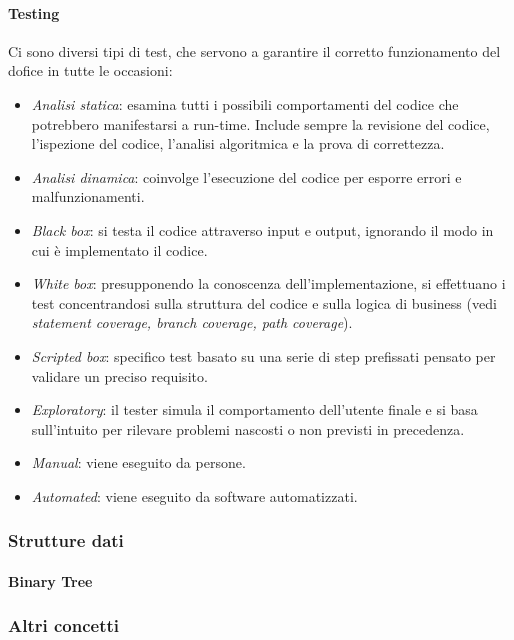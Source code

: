 \documentclass{article}
\begin{document}
            \paragraph{Testing} Ci sono diversi tipi di test, che servono a garantire il  corretto funzionamento del dofice in tutte le occasioni:
                 \begin{itemize}
                     \item \textit{Analisi statica}: esamina tutti i possibili comportamenti del codice che potrebbero manifestarsi a run-time. Include sempre la revisione del codice, l'ispezione del codice, l'analisi algoritmica e la prova di correttezza.
                     \item \textit{Analisi dinamica}: coinvolge l'esecuzione del codice per esporre errori e malfunzionamenti.
                     \item \textit{Black box}: si testa il codice attraverso input e output, ignorando il modo in cui è implementato il codice.
                     \item \textit{White box}: presupponendo la conoscenza dell'implementazione, si effettuano i test concentrandosi sulla struttura del codice e sulla logica di business (vedi \textit{statement coverage, branch coverage, path coverage}). 
                     \item \textit{Scripted box}: specifico test basato su una serie di step prefissati pensato per validare un preciso requisito.
                     \item \textit{Exploratory}: il tester simula il comportamento dell'utente finale e si basa sull'intuito per rilevare problemi nascosti o non previsti in precedenza.
                     \item \textit{Manual}: viene eseguito da persone.
                     \item \textit{Automated}: viene eseguito da software automatizzati.
                 \end{itemize}
        \subsubsection{Strutture dati}
            \paragraph{Binary Tree}
        \subsubsection{Altri concetti}
\end{document}
